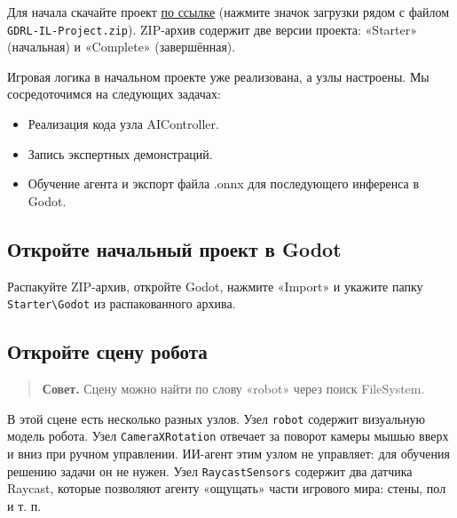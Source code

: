 \documentclass[11pt,a4paper]{article}
\begin{document}
Для начала скачайте проект \href{https://huggingface.co/ivan267/imitation-learning-tutorial-godot-project/tree/main}{по ссылке} (нажмите значок загрузки рядом с файлом \passthrough{\lstinline!GDRL-IL-Project.zip!}). ZIP-архив содержит две версии проекта: «Starter» (начальная) и «Complete» (завершённая).

Игровая логика в начальном проекте уже реализована, а узлы настроены. Мы сосредоточимся на следующих задачах:

\begin{itemize}
\tightlist
\item
  Реализация кода узла AIController.
\item
  Запись экспертных демонстраций.
\item
  Обучение агента и экспорт файла .onnx для последующего инференса в Godot.
\end{itemize}

\subsection{Откройте начальный проект в Godot}\label{open-the-starter-project-in-godot}

Распакуйте ZIP-архив, откройте Godot, нажмите «Import» и укажите папку \passthrough{\lstinline!Starter\\Godot!} из распакованного архива.

\subsection{Откройте сцену робота}\label{open-the-robot-scene}

\begin{quote}
\textbf{Совет.} Сцену можно найти по слову «robot» через поиск FileSystem.
\end{quote}

В этой сцене есть несколько разных узлов. Узел \passthrough{\lstinline!robot!} содержит визуальную модель робота. Узел \passthrough{\lstinline!CameraXRotation!} отвечает за поворот камеры мышью вверх и вниз при ручном управлении. ИИ-агент этим узлом не управляет: для обучения решению задачи он не нужен. Узел \passthrough{\lstinline!RaycastSensors!} содержит два датчика Raycast, которые позволяют агенту «ощущать» части игрового мира: стены, пол и т. п.

\end{document}
